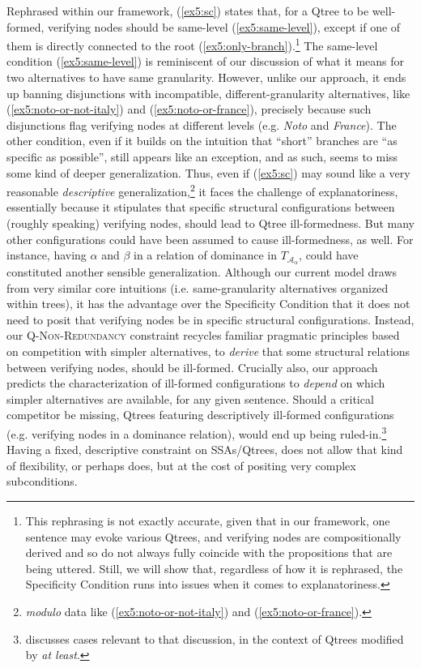 Rephrased within our framework, (\ref{ex5:sc}) states that, for a Qtree to be well-formed, verifying nodes should be same-level (\ref{ex5:same-level}), except if one of them is directly connected to the root (\ref{ex5:only-branch}).\footnote{This rephrasing is not exactly accurate, given that in our framework, one sentence may evoke various Qtrees, and verifying nodes are compositionally derived and so do not always fully coincide with the propositions that are being uttered. Still, we will show that, regardless of how it is rephrased, the Specificity Condition runs into issues when it comes to explanatoriness.} The same-level condition (\ref{ex5:same-level}) is reminiscent of our discussion of what it means for two alternatives to have same granularity. However, unlike our approach, it ends up banning disjunctions with incompatible, different-granularity alternatives, like (\ref{ex5:noto-or-not-italy}) and (\ref{ex5:noto-or-france}), precisely because such disjunctions flag verifying nodes at different levels (e.g. \textit{Noto} and \textit{France}). The other condition, even if it builds on the intuition that ``short'' branches are ``as specific as possible'', still appears like an exception, and as such, seems to miss some kind of deeper generalization. Thus, even if (\ref{ex5:sc}) may sound like a very reasonable \textit{descriptive} generalization,\footnote{\textit{modulo} data like (\ref{ex5:noto-or-not-italy}) and (\ref{ex5:noto-or-france}).} it faces the challenge of explanatoriness, essentially because it stipulates that specific structural configurations between (roughly speaking) verifying nodes, should lead to Qtree ill-formedness. But many other configurations could have been assumed to cause ill-formedness, as well. For instance, having $\alpha$ and $\beta$ in a relation of dominance in $T_{\mathcal{A}_{\alpha}}$, could have constituted another sensible generalization. Although our current model draws from very similar core intuitions (i.e. same-granularity alternatives organized within trees), it has the advantage over the Specificity Condition that it does not need to posit that verifying nodes be in specific structural configurations. Instead, our \textsc{Q-Non-Redundancy} constraint recycles familiar pragmatic principles based on competition with simpler alternatives, to \textit{derive} that some structural relations between verifying nodes, should be ill-formed. Crucially also, our approach predicts the characterization of ill-formed configurations to \textit{depend} on which simpler alternatives are available, for any given sentence. Should a critical competitor be missing, Qtrees featuring descriptively ill-formed configurations (e.g. verifying nodes in a dominance relation), would end up being ruled-in.\footnote{\citet{HenotMortier2025a} discusses cases relevant to that discussion, in the context of Qtrees modified by \textit{at least}.} Having a fixed, descriptive constraint on SSAs/Qtrees, does not allow that kind of flexibility, or perhaps does, but at the cost of positing very complex subconditions.\\

